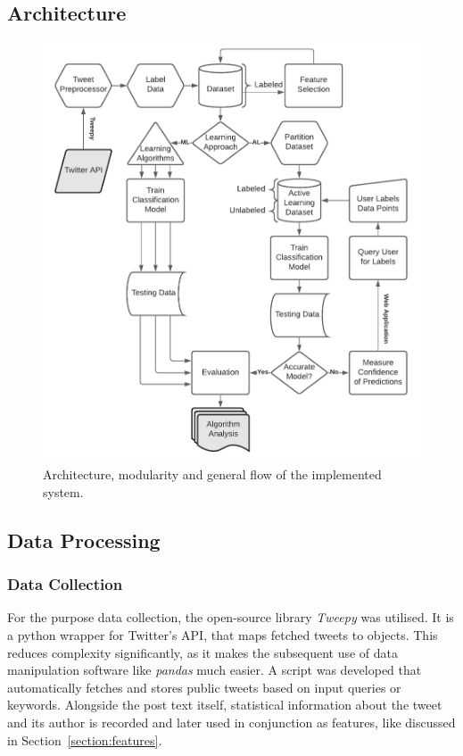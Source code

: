 \documentclass[a4paper,12pt]{article}
\begin{document}
\subsection{Architecture}
\label{section:architecture}
\begin{figure}[H]
\centering
\includegraphics[scale=0.84]{design.pdf}
\captionsetup{justification=centering}
\caption{\label{fig:moduleDiagram}Architecture, modularity and general flow of the implemented system.}
\end{figure}
\newpage
\subsection{Data Processing}
\label{section:processing}
\subsubsection{Data Collection}
For the purpose data collection, the open-source library \emph{Tweepy} was utilised. It is a python wrapper for Twitter's API, that maps fetched tweets to objects. This reduces complexity significantly, as it makes the subsequent use of data manipulation software like \emph{pandas} much easier.
A script was developed that automatically fetches and stores public tweets based on input queries or keywords. Alongside the post text itself, statistical information about the tweet and its author is recorded and later used in conjunction as features, like discussed in Section~\ref{section:features}.
\end{document}
